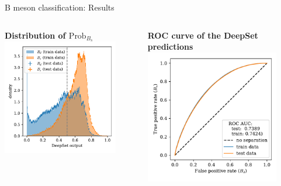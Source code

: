 \documentclass[aspectratio=1610, 10pt]{beamer}
\begin{document}
\begin{frame}{B meson classification: Results}
  \begin{columns}
    \begin{column}{0.5\textwidth}
      \centering
      \textbf{Distribution of $\text{Prob}_{B_s}$}
      \includegraphics[width=0.85\textwidth]{images/B_output.pdf}
    \end{column}
    \begin{column}{0.5\textwidth}
      \centering
      \textbf{ROC curve of the DeepSet predictions}
      \includegraphics[width=0.85\textwidth]{images/B_ROC.pdf}
    \end{column}
  \end{columns}
\end{frame}
\end{document}
